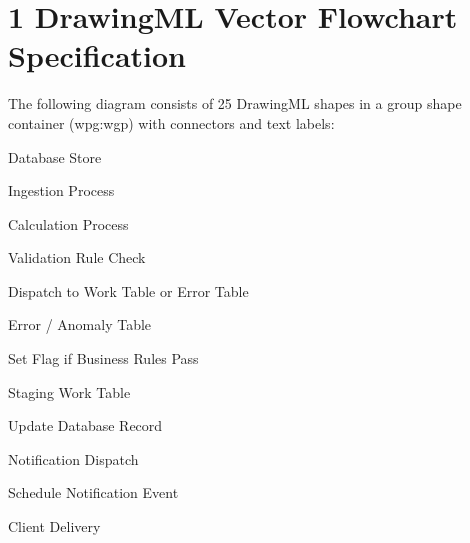\documentclass[11pt,a4paper]{article}
\begin{document}
\section{1 DrawingML Vector Flowchart Specification}

The following diagram consists of 25 DrawingML shapes in a group shape container (wpg:wgp) with connectors and text labels:

Database Store

Ingestion Process

Calculation Process

Validation Rule Check

Dispatch to Work Table or Error Table

Error / Anomaly Table

Set Flag if Business Rules Pass

Staging Work Table

Update Database Record

Notification Dispatch

Schedule Notification Event

Client Delivery

\begin{figure}[h]
\end{figure}
\end{document}
